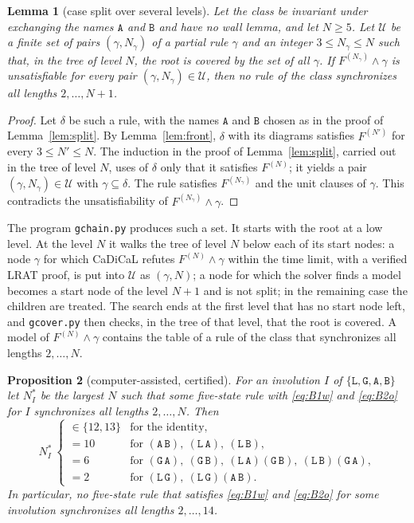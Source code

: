 \documentclass[11pt]{article}
\newtheorem{lemma}{Lemma}
\newtheorem{proposition}[lemma]{Proposition}
\theoremstyle{remark}
\newcommand{\Lq}{\mathtt{L}}\newcommand{\Gq}{\mathtt{G}}\newcommand{\Aq}{\mathtt{A}}\newcommand{\Bq}{\mathtt{B}}\newcommand{\Fq}{\mathtt{F}}
\begin{document}
\begin{lemma}[case split over several levels]\label{lem:levels}
Let the class be invariant under exchanging the names $\Aq$ and $\Bq$ and have no wall lemma, and let
$N\ge5$. Let $\mathcal U$ be a finite set of pairs $(\gamma,N_\gamma)$ of a partial rule $\gamma$ and an integer
$3\le N_\gamma\le N$ such that, in the tree of level $N$, the root is covered by the set of all $\gamma$. If
$F^{(N_\gamma)}\wedge\gamma$ is unsatisfiable for every pair $(\gamma,N_\gamma)\in\mathcal U$, then no rule of the
class synchronizes all lengths $2,\dots,N+1$.
\end{lemma}
\begin{proof}
Let $\delta$ be such a rule, with the names $\Aq$ and $\Bq$ chosen as in the proof of Lemma~\ref{lem:split}.
By Lemma~\ref{lem:front}, $\delta$ with its diagrams satisfies $F^{(N')}$ for every $3\le N'\le N$. The
induction in the proof of Lemma~\ref{lem:split}, carried out in the tree of level $N$, uses of $\delta$ only
that it satisfies $F^{(N)}$; it yields a pair $(\gamma,N_\gamma)\in\mathcal U$ with $\gamma\subseteq\delta$.
The rule satisfies $F^{(N_\gamma)}$ and the unit clauses of $\gamma$. This contradicts the unsatisfiability of $F^{(N_\gamma)}\wedge\gamma$.
\end{proof}

The program \texttt{gchain.py} produces such a set. It starts with the root at a low level. At the level $N$
it walks the tree of level $N$ below each of its start nodes: a node $\gamma$ for which CaDiCaL refutes
$F^{(N)}\wedge\gamma$ within the time limit, with a verified LRAT proof, is put into $\mathcal U$ as
$(\gamma,N)$; a node for which the solver finds a model becomes a start node of the level $N+1$ and is not
split; in the remaining case the children are treated. The search ends at the first level that has no
start node left, and \texttt{gcover.py} then checks, in the tree of that level, that the root is covered. A
model of $F^{(N)}\wedge\gamma$ contains the table of a rule of the class that synchronizes all lengths
$2,\dots,N$.

\begin{proposition}[computer-assisted, certified]\label{prop:b1b2nb}
For an involution $I$ of $\{\Lq,\Gq,\Aq,\Bq\}$ let $N^\ast_I$ be the largest $N$ such that some five-state rule
with \eqref{eq:B1w} and \eqref{eq:B2o} for $I$ synchronizes all lengths $2,\dots,N$. Then
\[
N^\ast_I\ \begin{cases}
\in\{12,13\}&\text{for the identity},\\
=10&\text{for }(\Aq\,\Bq),\ (\Lq\,\Aq),\ (\Lq\,\Bq),\\
=6&\text{for }(\Gq\,\Aq),\ (\Gq\,\Bq),\ (\Lq\,\Aq)(\Gq\,\Bq),\ (\Lq\,\Bq)(\Gq\,\Aq),\\
=2&\text{for }(\Lq\,\Gq),\ (\Lq\,\Gq)(\Aq\,\Bq).
\end{cases}
\]
In particular, no five-state rule that satisfies \eqref{eq:B1w} and \eqref{eq:B2o} for some involution
synchronizes all lengths $2,\dots,14$.
\end{proposition}
\end{document}
